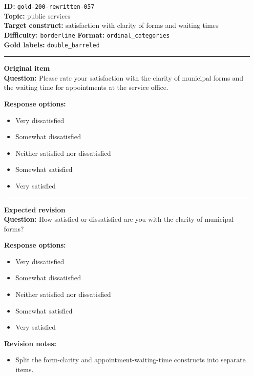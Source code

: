 \documentclass[10pt,a4paper]{article}
\newcommand{\sectionline}{\vspace{0.15em}\hrule\vspace{0.35em}}
\begin{document}
\begin{tcolorbox}[colframe=FlawRed,colback=white,colbacktitle=FlawRed!9,coltitle=black,title={Item 057\hfill Flawed item}]
\textbf{ID:} \texttt{gold-200-rewritten-057}\\
\textbf{Topic:} public services\\
\textbf{Target construct:} satisfaction with clarity of forms and waiting times\\
\textbf{Difficulty:} \texttt{borderline} \quad \textbf{Format:} \texttt{ordinal\_categories}\\
\textbf{Gold labels:} \texttt{double\_barreled}\\
\sectionline
\textbf{Original item}\\
\textbf{Question:} Please rate your satisfaction with the clarity of municipal forms and the waiting time for appointments at the service office.
\par\textbf{Response options:}
\begin{itemize}
\item Very dissatisfied
\item Somewhat dissatisfied
\item Neither satisfied nor dissatisfied
\item Somewhat satisfied
\item Very satisfied
\end{itemize}
\sectionline
\textbf{Expected revision}\\
\textbf{Question:} How satisfied or dissatisfied are you with the clarity of municipal forms?
\par\textbf{Response options:}
\begin{itemize}
\item Very dissatisfied
\item Somewhat dissatisfied
\item Neither satisfied nor dissatisfied
\item Somewhat satisfied
\item Very satisfied
\end{itemize}
\par\textbf{Revision notes:}
\begin{itemize}
\item Split the form-clarity and appointment-waiting-time constructs into separate items.
\end{itemize}
\end{tcolorbox}
\end{document}
